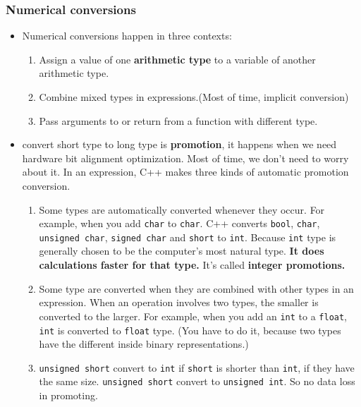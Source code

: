 \documentclass[a4paper,11pt,twoside]{book}
\begin{document}
\subsubsection{Numerical conversions}
\begin{itemize}
	\item Numerical conversions happen in three contexts:
	\begin{enumerate}
		\item Assign a value of one \textbf{arithmetic type} to a variable of another arithmetic type.
		
		\item Combine mixed types in expressions.(Most of time, implicit conversion)
		
		\item Pass arguments to or return from a function with different type.
	\end{enumerate}
	
	\item convert short type to long type is \textbf{promotion}, it happens when we need hardware bit alignment optimization. Most of time, we don't need to worry about it. In an expression, C++ makes three kinds of automatic promotion conversion.
	\begin{enumerate}
		\item Some types are automatically converted whenever they occur. For example, when you add \texttt{char} to \texttt{char}. C++ converts \texttt{bool}, \texttt{char}, \texttt{unsigned char}, \texttt{signed char} and \texttt{short} to \texttt{int}. Because \texttt{int} type is generally chosen to be the computer's most natural type. \textbf{It does calculations faster for that type.} It's called \textbf{integer promotions.}
		
		\item Some type are converted when they are combined with other types in an expression. When an operation involves two types, the smaller is converted to the larger. For example, when you add an \texttt{int} to a \texttt{float}, \texttt{int} is converted to \texttt{float} type. (You have to do it, because two types have the different inside binary representations.)
		
		\item \texttt{unsigned short} convert to \texttt{int} if \texttt{short} is shorter than \texttt{int}, if they have the same size. \texttt{unsigned short} convert to \texttt{unsigned int}.  So no data loss in promoting.
	\end{enumerate}
	

\end{itemize}
\end{document}
